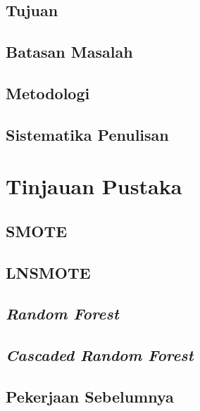 \section{Tujuan}
\label{sec:tujuan}


\section{Batasan Masalah}
\label{sec:batasan_masalah}


\section{Metodologi}
\label{sec:metodologi}


\section{Sistematika Penulisan}
\label{sec:sistematika_penulisan}


\chapter{Tinjauan Pustaka}

\section{SMOTE}


\section{LNSMOTE}


\section{\textit{Random Forest}}


\section{\textit{Cascaded Random Forest}}


\section{Pekerjaan Sebelumnya}


